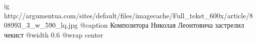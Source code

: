  
 
 
 
 

\ifcmt
	ig http://argumentua.com/sites/default/files/imagecache/Full_tekst_600x/article/808993_3_w_590_lq.jpg
	@caption Композитора Николая Леонтовича застрелил чекист
	@width 0.6
	@wrap center
\fi
